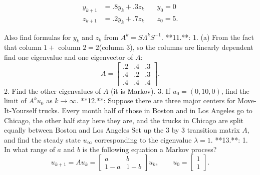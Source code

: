 \[\begin{split} y_{k+1}&=.8y_{k}+.3z_{k}&\quad y_{0}=0\\ z_{k+1}&=.2y_{k}+.7z_{k}&\quad z_{0}=5.\end{split}\]

Also find formulas for \(y_{k}\) and \(z_{k}\) from \(A^{k}=S\Lambda^{k}S^{-1}\).
**11.**:
1. (a) From the fact that column \(1+\) column \(2=2\)(column 3), so the columns are linearly dependent find one eigenvalue and one eigenvector of \(A\): \[A=\begin{bmatrix}.2&.4&.3\\ .4&.2&.3\\ .4&.4&.4\end{bmatrix}.\]
2. Find the other eigenvalues of \(A\) (it is Markov).
3. If \(u_{0}=(0,10,0)\), find the limit of \(A^{k}u_{0}\) as \(k\to\infty\).
**12.**: Suppose there are three major centers for Move-It-Yourself trucks. Every month half of those in Boston and in Los Angeles go to Chicago, the other half stay here they are, and the trucks in Chicago are split equally between Boston and Los Angeles Set up the 3 by 3 transition matrix \(A\), and find the steady state \(u_{\infty}\) corresponding to the eigenvalue \(\lambda=1\).
**13.**:
1. In what range of \(a\) and \(b\) is the following equation a Markov process? \[u_{k+1}=Au_{k}=\begin{bmatrix}a&b\\ 1-a&1-b\end{bmatrix}u_{k},\qquad u_{0}=\begin{bmatrix}1\\ 1\end{bmatrix}.\]